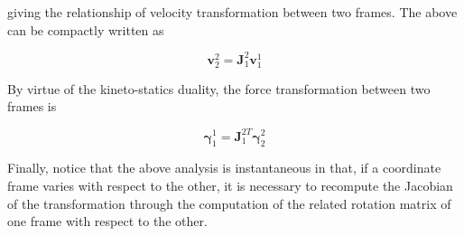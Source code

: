 \documentclass[10pt]{article}
\begin{document}
giving the  relationship of velocity transformation between two frames. The above can be compactly written as



$$
\boldsymbol{v}_{2}^{2}=\boldsymbol{J}_{1}^{2} \boldsymbol{v}_{1}^{1}
$$

By virtue of the kineto-statics duality, the force transformation between two frames is

$$
\boldsymbol{\gamma}_{1}^{1}=\boldsymbol{J}_{1}^{2 T} \boldsymbol{\gamma}_{2}^{2}
$$



Finally, notice that the above analysis is instantaneous in that, if a coordinate frame varies with respect to the other, it is necessary to recompute the Jacobian of the transformation through the computation of the related rotation matrix of one frame with respect to the other.
\end{document}
